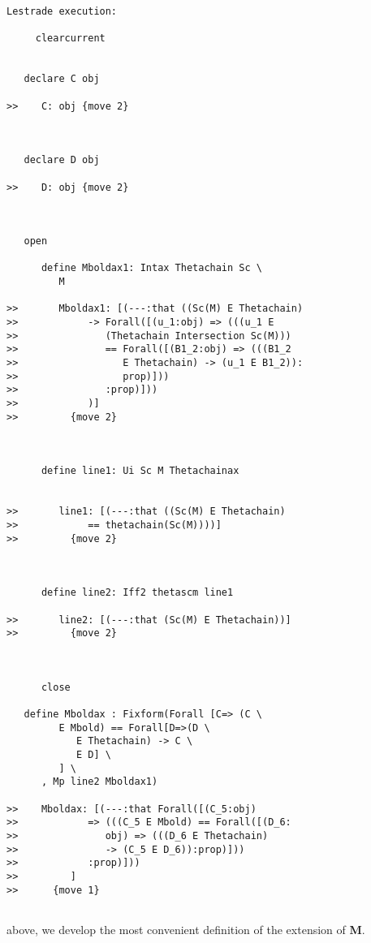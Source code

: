 \documentclass[12pt]{article}
\begin{document}
\begin{verbatim}Lestrade execution:

     clearcurrent


   declare C obj

>>    C: obj {move 2}



   declare D obj

>>    D: obj {move 2}



   open

      define Mboldax1: Intax Thetachain Sc \
         M

>>       Mboldax1: [(---:that ((Sc(M) E Thetachain)
>>            -> Forall([(u_1:obj) => (((u_1 E
>>               (Thetachain Intersection Sc(M)))
>>               == Forall([(B1_2:obj) => (((B1_2
>>                  E Thetachain) -> (u_1 E B1_2)):
>>                  prop)]))
>>               :prop)]))
>>            )]
>>         {move 2}



      define line1: Ui Sc M Thetachainax


>>       line1: [(---:that ((Sc(M) E Thetachain)
>>            == thetachain(Sc(M))))]
>>         {move 2}



      define line2: Iff2 thetascm line1

>>       line2: [(---:that (Sc(M) E Thetachain))]
>>         {move 2}



      close

   define Mboldax : Fixform(Forall [C=> (C \
         E Mbold) == Forall[D=>(D \
            E Thetachain) -> C \
            E D] \
         ] \
      , Mp line2 Mboldax1)

>>    Mboldax: [(---:that Forall([(C_5:obj)
>>            => (((C_5 E Mbold) == Forall([(D_6:
>>               obj) => (((D_6 E Thetachain)
>>               -> (C_5 E D_6)):prop)]))
>>            :prop)]))
>>         ]
>>      {move 1}


\end{verbatim}

above, we develop the most convenient definition of the extension of {\bf M}.
\end{document}
